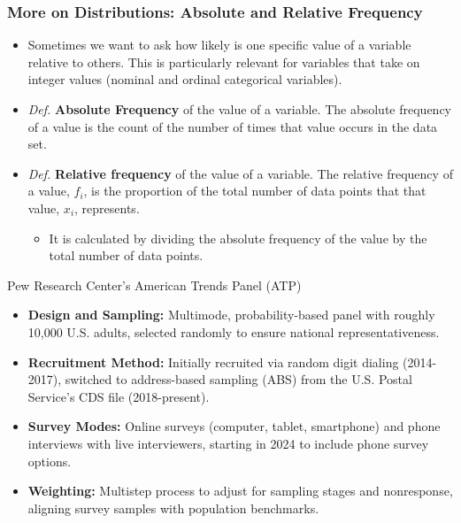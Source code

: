 \documentclass[handout]{beamer} %
\begin{document}
\begin{frame}
\frametitle{More on Distributions: Absolute and Relative Frequency}
\begin{itemize}
\item Sometimes we want to ask how likely is one specific value of a variable relative to others. This is particularly relevant for variables that take on integer values (nominal and ordinal categorical variables).
\item \emph{Def.} \textbf{Absolute Frequency} of the value of a variable. The absolute frequency of a value is the count of the number of times that value occurs in the data set.
\item \emph{Def.} \textbf{Relative frequency} of the value of a variable. The relative frequency of a value, $f_i$, is the proportion of the total number of data points that that value, $x_i$, represents. 
\begin{itemize}
    \item  It is calculated by dividing the absolute frequency of the value by the total number of data points.
\end{itemize}

\end{itemize}
\end{frame}


\begin{frame}{Pew Research Center's American Trends Panel (ATP)}
\begin{itemize}
    \item \textbf{Design and Sampling:} Multimode, probability-based panel with roughly 10,000 U.S. adults, selected randomly to ensure national representativeness.
    \item \textbf{Recruitment Method:} Initially recruited via random digit dialing (2014-2017), switched to address-based sampling (ABS) from the U.S. Postal Service's CDS file (2018-present).
    \item \textbf{Survey Modes:} Online surveys (computer, tablet, smartphone) and phone interviews with live interviewers, starting in 2024 to include phone survey options.
    \item \textbf{Weighting:} Multistep process to adjust for sampling stages and nonresponse, aligning survey samples with population benchmarks.
\end{itemize}
\end{frame}
\end{document}
